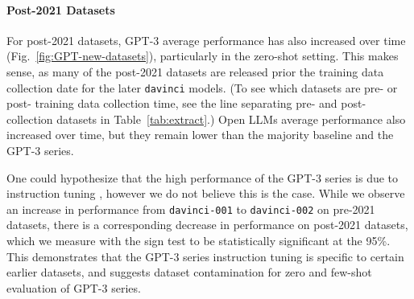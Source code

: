 \documentclass[letterpaper]{article} %
\newcommand{\nilay}[1]{}
\newcommand{\cm}[1]{}  %
\begin{document}
\paragraph{Post-2021 Datasets}
For post-2021 datasets, GPT-3 average performance has also increased over time (Fig.~\ref{fig:GPT-new-datasets}), particularly in the zero-shot setting.  This makes sense, as many of the post-2021 datasets are released prior the training data collection date for the later \texttt{davinci} models.  (To see which datasets are pre- or post- training data collection time, see the line separating pre- and post- collection datasets in Table~\ref{tab:extract}.)  Open LLMs average performance also increased over time, but they remain lower than the majority baseline and the GPT-3 series.

One could hypothesize that the high performance of the GPT-3 series is due to instruction tuning \cite{ouyang2022}, however we do not believe this is the case.  While we observe an increase in performance from \texttt{davinci-001} to \texttt{davinci-002} on pre-2021 datasets, there is a corresponding decrease in performance on post-2021 datasets, which we measure with the sign test to be statistically significant at the 95\%\cm{Increase on zero-shot pre p\_value=0.00408, Decrease on zero-shot post p\_value=0.02939.}. This demonstrates that the GPT-3 series instruction tuning is specific to certain earlier datasets, and suggests dataset contamination for zero and few-shot evaluation of GPT-3 series. \nilay{would this indicate dataset (test data) contamination or task contamination? Or both?}



\end{document}
